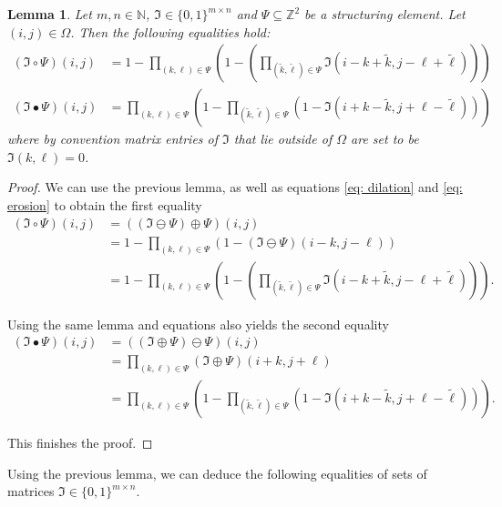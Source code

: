 \documentclass[a4paper,12pt]{article}
\theoremstyle{plain}
\newtheorem{lemma}[theorem]{Lemma}
\theoremstyle{definition}
\begin{document}
\begin{lemma}
	Let $m, n \in \mathbb{N}$, $\mathfrak{I} \in \{ 0, 1 \}^{m \times n}$ and $\Psi \subseteq \mathbb{Z}^2$ be a structuring element. Let $(i, j) \in \Omega$. Then the following equalities hold:
	\begin{align}
		(\mathfrak{I} \circ \Psi)(i, j) &= 1 - \prod_{(k, \ell) \in \Psi} \left( 1 - \left( \prod_{(\tilde{k}, \tilde{\ell}) \in \Psi} \mathfrak{I}(i - k + \tilde{k}, j - \ell + \tilde{\ell}) \right) \right) \label{eq: opening} \\
		(\mathfrak{I} \bullet \Psi)(i, j) &= \prod_{(k, \ell) \in \Psi} \left( 1 - \prod_{(\tilde{k}, \tilde{\ell}) \in \Psi} ( 1 - \mathfrak{I}(i + k - \tilde{k}, j + \ell - \tilde{\ell}) ) \right) \label{eq: closing}
	\end{align}
	where by convention matrix entries of $\mathfrak{I}$ that lie outside of $\Omega$ are set to be $\mathfrak{I}(k, \ell) = 0$.
\end{lemma}
\begin{proof}
	We can use the previous lemma, as well as equations \eqref{eq: dilation} and \eqref{eq: erosion} to obtain the first equality
	\begin{align*}
		(\mathfrak{I} \circ \Psi)(i, j) &= ((\mathfrak{I} \ominus \Psi) \oplus \Psi)(i, j) \\
		&= 1 - \prod_{(k, \ell) \in \Psi} ( 1 - (\mathfrak{I} \ominus \Psi)(i - k, j - \ell) ) \\
		&= 1 - \prod_{(k, \ell) \in \Psi} \left( 1 - \left( \prod_{(\tilde{k}, \tilde{\ell}) \in \Psi} \mathfrak{I}(i - k + \tilde{k}, j - \ell + \tilde{\ell}) \right) \right).
	\end{align*}
	
	Using the same lemma and equations also yields the second equality
	\begin{align*}
		(\mathfrak{I} \bullet \Psi)(i, j) &= ((\mathfrak{I} \oplus \Psi) \ominus \Psi)(i, j) \\
		&= \prod_{(k, \ell) \in \Psi} (\mathfrak{I} \oplus \Psi)(i + k, j + \ell) \\
		&= \prod_{(k, \ell) \in \Psi} \left( 1 - \prod_{(\tilde{k}, \tilde{\ell}) \in \Psi} ( 1 - \mathfrak{I}(i + k - \tilde{k}, j + \ell - \tilde{\ell}) ) \right).
	\end{align*}
	
	This finishes the proof.
\end{proof}

Using the previous lemma, we can deduce the following equalities of sets of matrices $\mathfrak{I} \in \{ 0, 1 \}^{m \times n}$.
\end{document}
